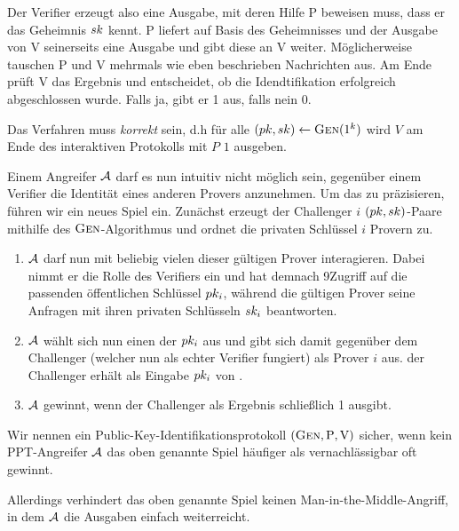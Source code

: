 Der Verifier erzeugt also eine Ausgabe, mit deren Hilfe
P beweisen muss, dass er das Geheimnis $sk$ kennt. P liefert auf Basis
des Geheimnisses und der Ausgabe von V seinerseits eine Ausgabe und gibt
diese an V weiter. Möglicherweise tauschen P und V mehrmals wie eben
beschrieben Nachrichten aus. Am Ende prüft V das Ergebnis und
entscheidet, ob die Idendtifikation erfolgreich abgeschlossen wurde. Falls ja,
gibt er 1 aus, falls nein 0. 

Das Verfahren muss \emph{korrekt} sein, d.h für alle $(pk, sk)
\leftarrow \textsc{Gen}(1^k)$ wird $V$ am Ende des interaktiven Protokolls mit
$P$ $1$ ausgeben. 

Einem Angreifer $\mathcal{A}$ darf es nun intuitiv nicht möglich sein, gegenüber
einem Verifier die Identität eines anderen Provers anzunehmen. Um das zu
präzisieren, führen wir ein neues Spiel ein. Zunächst erzeugt der Challenger $i$
$(pk, sk)$-Paare mithilfe des $\textsc{Gen}$-Algorithmus und ordnet die privaten Schlüssel $i$ Provern zu.
\begin{enumerate}
  \item $\mathcal{A}$ darf nun mit beliebig vielen dieser gültigen Prover
    interagieren. Dabei nimmt er die Rolle des Verifiers ein und hat demnach
    9Zugriff auf die passenden öffentlichen Schlüssel $pk_i$, während die
    gültigen Prover seine Anfragen mit ihren privaten Schlüsseln $sk_i$
    beantworten.
  \item $\mathcal{A}$ wählt sich nun einen der $pk_{i}$ aus und gibt sich
    damit gegenüber dem Challenger (welcher nun als \glqq echter\grqq{}
    Verifier fungiert) als Prover $i$ aus. der Challenger erhält als
    Eingabe $pk_i$ von \A.
  \item $\mathcal{A}$ gewinnt, wenn der Challenger als Ergebnis schließlich 1
ausgibt.
\end{enumerate} Wir nennen ein Public-Key-Identifikationsprotokoll
$(\textsc{Gen}, \mathrm{P}, \mathrm{V})$ sicher, wenn kein PPT-Angreifer $\mathcal{A}$
das oben genannte Spiel häufiger als vernachlässigbar oft gewinnt.

Allerdings verhindert das oben genannte Spiel keinen
Man-in-the-Middle-Angriff, in dem $\mathcal{A}$ die Ausgaben einfach
weiterreicht.

